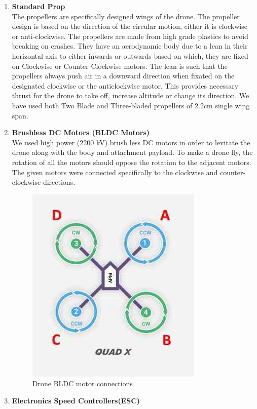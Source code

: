 \begin{enumerate}
    \item \textbf{Standard Prop}\\
    The propellers are specifically designed wings of the drone. The propeller design is based on the direction of the circular motion, either it is clockwise or anti-clockwise. The propellers are made from high grade plastics to avoid breaking on crashes. They have an aerodynamic body due to a lean in their horizontal axis to either inwards or outwards based on which, they are fixed on Clockwise or Counter Clockwise motors. The lean is such that the propellers always push air in a downward direction when fixated on the designated clockwise or the anticlockwise motor. This provides necessary thrust for the drone to take off, increase altitude or change its direction. We have used both Two Blade and Three-bladed propellers of 2.2cm single wing span.
    \item \textbf{Brushless DC Motors (BLDC Motors)}\\
    We used high power (2200 kV) brush less DC motors in order to levitate the drone along with the body and attachment payload. To make a drone fly, the rotation of all the motors should oppose the rotation to the adjacent motors. The given motors were connected specifically to the clockwise and counter-clockwise directions.
    \begin{figure}[H]
    \centering
    \includegraphics[]{SummerInterReport/project/Images-Major/motors.png}
    \caption{Drone BLDC motor connections}
    \label{fig:motors}
\end{figure}
    \item \textbf{Electronics Speed Controllers(ESC)}\\

\end{enumerate}
